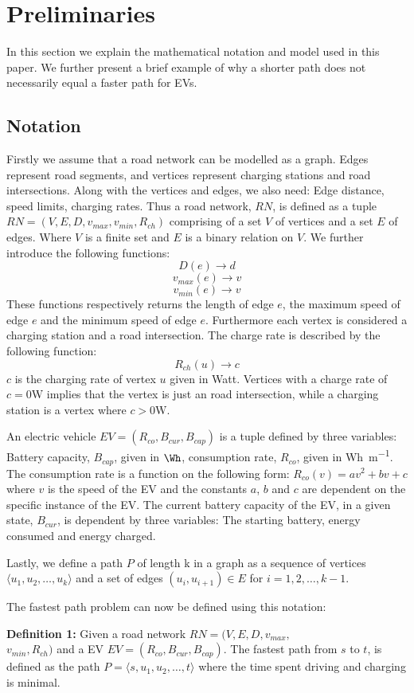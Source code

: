 \section{Preliminaries} \label{sec:notation}
In this section we explain the mathematical notation and model used in this paper. We further present a brief example of why a shorter path does not necessarily equal a faster path for EVs. 

\subsection{Notation}
Firstly we assume that a road network can be modelled as a graph. Edges represent road segments, and vertices represent charging stations and road intersections. Along with the vertices and edges, we also need: Edge distance, speed limits, charging rates. Thus a road network, $RN$, is defined as a tuple $RN=(V,E,D,v_{max},v_{min},R_{ch})$ comprising of a set $V$ of vertices and a set $E$ of edges. Where $V$ is a finite set and $E$ is a binary relation on $V$. We further introduce the following functions:
\[ D(e)\rightarrow d \] 
\[ v_{max}(e)\rightarrow v \]
\[ v_{min}(e)\rightarrow v \]
These functions respectively returns the length of edge $e$, the maximum speed of edge $e$ and the minimum speed of edge $e$. Furthermore each vertex is considered a charging station and a road intersection. The charge rate is described by the following function:
\[R_{ch}(u)\rightarrow c\]
$c$ is the charging rate of vertex $u$ given in Watt. Vertices with a charge rate of $c = 0\si{\W}$ implies that the vertex is just an road intersection, while a charging station is a vertex where $c > 0\si{\W}$. 

An electric vehicle $EV=(R_{co},B_{cur},B_{cap})$ is a tuple defined by three variables: Battery capacity, $B_{cap}$, given in $\si{\Wh}$, consumption rate, $R_{co}$, given in \si{Wh\per m}. The consumption rate is a function on the following form:
\( R_{co}(v)=av^2+bv+c \)
where $v$ is the speed of the EV and the constants $a$, $b$ and $c$ are dependent on the specific instance of the EV. The current battery capacity of the EV, in a given state, $B_{cur}$, is dependent by three variables: The starting battery, energy consumed and energy charged.


Lastly, we define a path $P$ of length k in a graph as a sequence of vertices $\langle u_1,u_2,\dots,u_k \rangle$ and a set of edges $(u_{i},u_{i+1})\in E$ for $i=1,2,\dots,k-1$.

The fastest path problem can now be defined using this notation:

\textbf{Definition 1:} Given a road network $RN=(V,E,D,v_{max},$\\ 
$v_{min},R_{ch})$ and a EV $EV=(R_{co},B_{cur},B_{cap})$. The fastest path 
from $s$ to $t$, is defined as the path $P = \langle s,u_1,u_2,\dots,t \rangle$ where the time spent driving and charging is minimal. 
 



